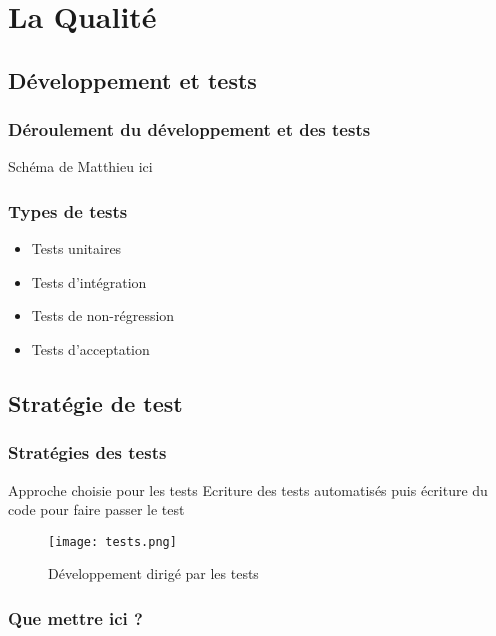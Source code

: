 \section{La Qualité}


\subsection{Développement et tests}

\begin{frame}
  \frametitle{\color{white} Déroulement du développement et des tests}
  Schéma de Matthieu ici

\end{frame}

\begin{frame}
  \frametitle{\color{white} Types de tests}
  \begin{itemize}
  \item Tests unitaires
  \item Tests d'intégration
  \item Tests de non-régression
  \item Tests d'acceptation
  \end{itemize}
  
  
\end{frame}



\subsection{Stratégie de test}
\begin{frame}
  \frametitle{\color{white} Stratégies des tests}
  \begin{block}{Approche choisie pour les tests}
   Ecriture des tests automatisés puis écriture du code pour faire passer le test
  \end{block}
  \begin{figure}[p]
    \centering
    \texttt{[image: tests.png]}
    \caption{Développement dirigé par les tests}
  \end{figure}
\end{frame}

\begin{frame}
  \frametitle{\color{white} Que mettre ici ?}
  

\end{frame}



